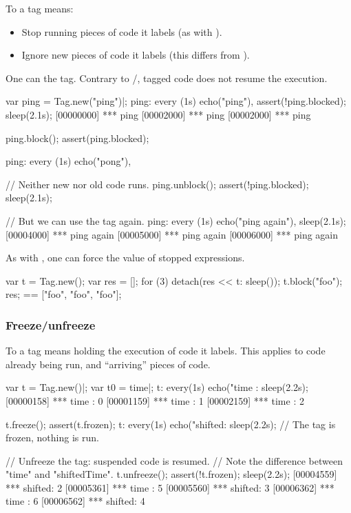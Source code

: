 To  a tag means:
\begin{itemize}
\item Stop running pieces of code it labels (as with
  ).
\item Ignore new pieces of code it labels (this differs from
  ).
\end{itemize}

One can  the tag.  Contrary to
/, tagged code does not resume the
execution.

\begin{urbiscript}[firstnumber=1]
var ping = Tag.new("ping")|;
ping:
  every (1s)
    echo("ping"),
assert(!ping.blocked);
sleep(2.1s);
[00000000] *** ping
[00002000] *** ping
[00002000] *** ping

ping.block();
assert(ping.blocked);

ping:
  every (1s)
    echo("pong"),

// Neither new nor old code runs.
ping.unblock();
assert(!ping.blocked);
sleep(2.1s);

// But we can use the tag again.
ping:
  every (1s)
    echo("ping again"),
sleep(2.1s);
[00004000] *** ping again
[00005000] *** ping again
[00006000] *** ping again
\end{urbiscript}

As with , one can force the value of stopped
expressions.

\begin{urbiassert}[firstnumber=1]
{
  var t = Tag.new();
  var res = [];
  for (3)
    detach(res << {t: sleep()});
  t.block("foo");
  res;
}
==
["foo", "foo", "foo"];
\end{urbiassert}

\subsubsection{Freeze/unfreeze}
\label{sec:specs:tag:freeze}

To  a tag means holding the execution of code it labels.
This applies to code already being run, and ``arriving'' pieces of code.

\begin{urbiscript}[firstnumber=1]
var t = Tag.new()|;
var t0 = time|;
t: every(1s) echo("time   : %
sleep(2.2s);
[00000158] *** time   : 0
[00001159] *** time   : 1
[00002159] *** time   : 2

t.freeze();
assert(t.frozen);
t: every(1s) echo("shifted: %
sleep(2.2s);
// The tag is frozen, nothing is run.

// Unfreeze the tag: suspended code is resumed.
// Note the difference between "time" and "shiftedTime".
t.unfreeze();
assert(!t.frozen);
sleep(2.2s);
[00004559] *** shifted: 2
[00005361] *** time   : 5
[00005560] *** shifted: 3
[00006362] *** time   : 6
[00006562] *** shifted: 4
\end{urbiscript}


